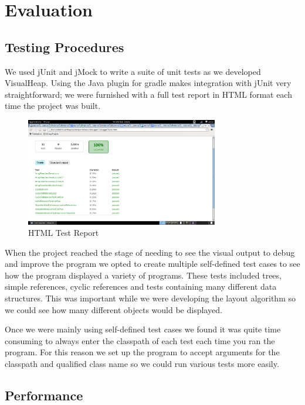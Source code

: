 \documentclass[11pt, a4paper]{report}
\begin{document}
\chapter{Evaluation}

\section{Testing Procedures}

We used jUnit and jMock to write a suite of unit tests as we developed VisualHeap. Using the Java plugin for gradle makes integration with jUnit very straightforward; we were furnished with a full test report in HTML format each time the project was built.

\begin{figure}[h]
        \centering
        \includegraphics[width=0.75\textwidth]{images/final/testresults.png}
        \caption{HTML Test Report}
\end{figure}

When the project reached the stage of needing to see the visual output to debug and improve the program we opted to create multiple self-defined test cases to see how the program displayed a variety of programs. These tests included trees, simple references, cyclic references and tests containing many different data structures. This was important while we were developing the layout algorithm so we could see how many different objects would be displayed.

Once we were mainly using self-defined test cases we found it was quite time consuming to always enter the classpath of each test each time you ran the program. For this reason we set up the program to accept arguments for the classpath and qualified class name so we could run various tests more easily.

\section{Performance}
\end{document}
